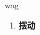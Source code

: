 
\begin{frame}
{\huge wag}
\begin{center}
\begin{enumerate}\Large
  \item \textbf{摆动}
\end{enumerate}
\end{center}
\end{frame}
